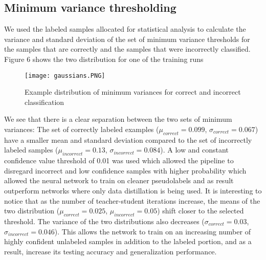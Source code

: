 \documentclass{article}
\begin{document}
\subsection{Minimum variance thresholding}
We used the labeled samples allocated for statistical analysis to calculate the variance and standard deviation of the set of minimum variance thresholds for the samples that are correctly and the samples that were incorrectly classified. Figure 6 shows the two distribution for one of the training runs
\begin{wrapfigure}{r}{7.5cm}
\texttt{[image: gaussians.PNG]}
\caption{Example distribution of minimum variances for correct and incorrect classification}
\label{min_var_gaussian}
\end{wrapfigure}
We see that there is a clear separation between the two sets of minimum variances: The set of correctly labeled examples ($\mu_{correct} = 0.099
$, $\sigma_{correct}=0.067$) have a smaller mean and standard deviation compared to the set of incorrectly labeled samples ($\mu_{incorrect} = 0.13
$, $\sigma_{incorrect}=0.084$). A low and constant confidence value threshold of 0.01 was used which allowed the pipeline to disregard incorrect and low confidence samples with higher probability which allowed the neural network to train on cleaner pseudolabels and as result outperform networks where only data distillation is being used. It is interesting to notice that as the number of teacher-student iterations increase, the means of the two distribution ($\mu_{correct} = 0.025
$, $\mu_{incorrect} = 0.05
$) shift closer to the selected threshold. The variance of the two distributions also decreases ($\sigma_{correct}=0.03$, $\sigma_{incorrect}=0.046$). This allows the network to train on an increasing number of highly confident unlabeled samples in addition to the labeled portion, and as a result, increase its testing accuracy and generalization performance.




\end{document}
